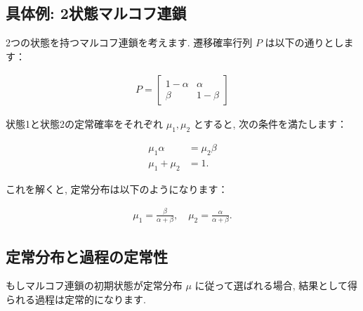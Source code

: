 \documentclass[a4j]{jsarticle}
\begin{document}
{	\subsection*{具体例: 2状態マルコフ連鎖}
	2つの状態を持つマルコフ連鎖を考えます. 遷移確率行列 $P$ は以下の通りとします：

	\begin{align*}
		P =
		\begin{bmatrix}
			1-\alpha & \alpha  \\
			\beta    & 1-\beta
		\end{bmatrix}
	\end{align*}

	状態1と状態2の定常確率をそれぞれ $\mu_1, \mu_2$ とすると, 次の条件を満たします：

	\begin{align*}
		\mu_1 \alpha  & = \mu_2 \beta \\
		\mu_1 + \mu_2 & = 1.
	\end{align*}

	これを解くと, 定常分布は以下のようになります：

	\begin{align*}
		\mu_1 = \frac{\beta}{\alpha + \beta}, \quad \mu_2 = \frac{\alpha}{\alpha + \beta}.
	\end{align*}

	\subsection*{定常分布と過程の定常性}
	もしマルコフ連鎖の初期状態が定常分布 $\mu$ に従って選ばれる場合, 結果として得られる過程は定常的になります.
}
\end{document}
